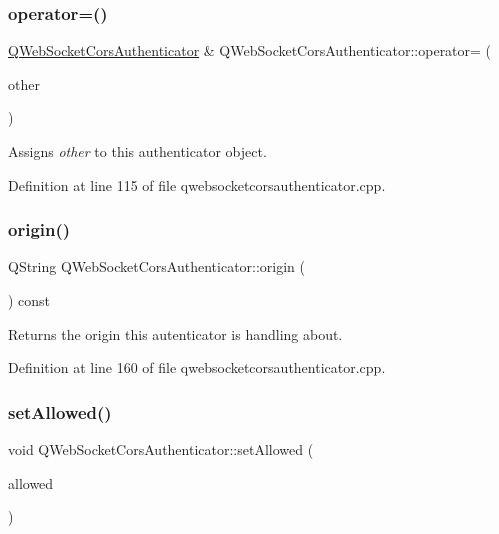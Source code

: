 \subsubsection{\texorpdfstring{operator=()}{operator=()}}
{\footnotesize\ttfamily \mbox{\hyperlink{class_q_web_socket_cors_authenticator}{Q\+Web\+Socket\+Cors\+Authenticator}} \& Q\+Web\+Socket\+Cors\+Authenticator\+::operator= (\begin{DoxyParamCaption}\item[{const \mbox{\hyperlink{class_q_web_socket_cors_authenticator}{Q\+Web\+Socket\+Cors\+Authenticator}} \&}]{other }\end{DoxyParamCaption})}

Assigns {\itshape other} to this authenticator object. 

Definition at line 115 of file qwebsocketcorsauthenticator.\+cpp.

\mbox{\label{class_q_web_socket_cors_authenticator_a5203b2383c444d4b4facc7f1fba283b0}} 
\subsubsection{\texorpdfstring{origin()}{origin()}}
{\footnotesize\ttfamily Q\+String Q\+Web\+Socket\+Cors\+Authenticator\+::origin (\begin{DoxyParamCaption}{ }\end{DoxyParamCaption}) const}

Returns the origin this autenticator is handling about. 

Definition at line 160 of file qwebsocketcorsauthenticator.\+cpp.

\mbox{\label{class_q_web_socket_cors_authenticator_a1b74ba4993ef3092dc9a5de402467413}} 
\subsubsection{\texorpdfstring{set\+Allowed()}{setAllowed()}}
{\footnotesize\ttfamily void Q\+Web\+Socket\+Cors\+Authenticator\+::set\+Allowed (\begin{DoxyParamCaption}\item[{bool}]{allowed }\end{DoxyParamCaption})}

